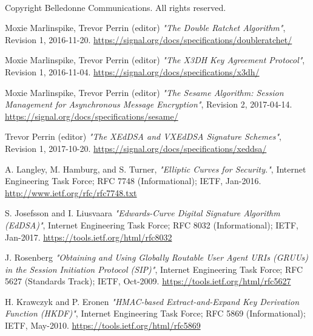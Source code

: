 \documentclass[a4paper,11pt]{article}
\begin{document}
  \paragraph*{}Copyright Belledonne Communications.  All rights reserved.
\newpage
\begin{thebibliography}{99}

  Moxie Marlinspike, Trevor Perrin (editor)
  \textit{\: "The Double Ratchet Algorithm"},
  Revision 1,
  2016-11-20.
  \href{https://signal.org/docs/specifications/doubleratchet/}{https://signal.org/docs/specifications/doubleratchet/}

  Moxie Marlinspike, Trevor Perrin (editor)
  \textit{\: "The X3DH Key Agreement Protocol"},
  Revision 1,
  2016-11-04.
  \href{https://signal.org/docs/specifications/x3dh/}{https://signal.org/docs/specifications/x3dh/} 

  Moxie Marlinspike, Trevor Perrin (editor)
  \textit{\: "The Sesame Algorithm: Session Management for Asynchronous Message Encryption"},
  Revision 2,
  2017-04-14.
  \href{https://signal.org/docs/specifications/sesame/}{https://signal.org/docs/specifications/sesame/}

  Trevor Perrin (editor)
  \textit{\: "The XEdDSA and VXEdDSA Signature Schemes"},
  Revision 1,
  2017-10-20.
  \href{https://signal.org/docs/specifications/xeddsa/}{https://signal.org/docs/specifications/xeddsa/}

  A. Langley, M. Hamburg, and S. Turner,
  \textit{\: "Elliptic Curves for Security."},
  Internet Engineering Task Force; RFC 7748 (Informational); IETF, Jan-2016.
  \href{http://www.ietf.org/rfc/rfc7748.txt}{http://www.ietf.org/rfc/rfc7748.txt}
  
  S. Josefsson and I. Liusvaara
  \textit{\: "Edwards-Curve Digital Signature Algorithm (EdDSA)"},
  Internet Engineering Task Force; RFC 8032 (Informational); IETF, Jan-2017.
  \href{https://tools.ietf.org/html/rfc8032}{https://tools.ietf.org/html/rfc8032}

  J. Rosenberg
  \textit{\:"Obtaining and Using Globally Routable User Agent URIs (GRUUs) in the Session Initiation Protocol (SIP)"},
  Internet Engineering Task Force; RFC 5627 (Standards Track); IETF, Oct-2009.
  \href{https://tools.ietf.org/html/rfc5627}{https://tools.ietf.org/html/rfc5627}
  
  H. Krawczyk and P. Eronen
  \textit{\:"HMAC-based Extract-and-Expand Key Derivation Function (HKDF)"},
  Internet Engineering Task Force; RFC 5869 (Informational); IETF, May-2010.
  \href{https://tools.ietf.org/html/rfc5869}{https://tools.ietf.org/html/rfc5869}
  

\end{thebibliography}
\end{document}
